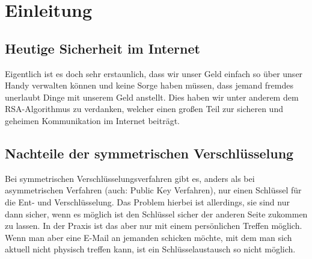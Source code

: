 \documentclass[14pt,a4paper]{scrartcl}
\begin{document}
	
\thispagestyle{empty}
\tableofcontents
\thispagestyle{empty}


\pagebreak
\section{Einleitung}
\subsection{Heutige Sicherheit im Internet}
Eigentlich ist es doch sehr erstaunlich, dass wir unser Geld einfach so über unser Handy verwalten können und keine Sorge haben müssen, dass jemand fremdes unerlaubt Dinge mit unserem Geld anstellt. Dies haben wir unter anderem dem RSA-Algorithmus zu verdanken, welcher einen großen Teil zur sicheren und geheimen Kommunikation im Internet beiträgt.

\subsection{Nachteile der symmetrischen Verschlüsselung}

Bei symmetrischen Verschlüsselungsverfahren gibt es, anders als bei asymmetrischen Verfahren (auch: Public Key Verfahren), nur einen Schlüssel für die Ent- und Verschlüsselung. Das Problem hierbei ist allerdings, sie sind nur dann sicher, wenn es möglich ist den Schlüssel sicher der anderen Seite zukommen zu lassen. In der Praxis ist das aber nur mit einem persönlichen Treffen möglich. Wenn man aber eine E-Mail an jemanden schicken möchte, mit dem man sich aktuell nicht physisch treffen kann, ist ein Schlüsselaustausch so nicht möglich.
\end{document}
